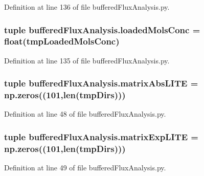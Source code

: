 Definition at line 136 of file buffered\-Flux\-Analysis.\-py.

\hypertarget{namespacebuffered_flux_analysis_a7e05b85cf7e9b63ac9aa0582932185b4}{
\subsubsection[{loaded\-Mols\-Conc}]{\setlength{\rightskip}{0pt plus 5cm}tuple buffered\-Flux\-Analysis.\-loaded\-Mols\-Conc = float(tmp\-Loaded\-Mols\-Conc)}}\label{namespacebuffered_flux_analysis_a7e05b85cf7e9b63ac9aa0582932185b4}


Definition at line 135 of file buffered\-Flux\-Analysis.\-py.

\hypertarget{namespacebuffered_flux_analysis_a1f521f6f720583fe2e06f9a3127841fb}{
\subsubsection[{matrix\-Abs\-L\-I\-T\-E}]{\setlength{\rightskip}{0pt plus 5cm}tuple buffered\-Flux\-Analysis.\-matrix\-Abs\-L\-I\-T\-E = np.\-zeros((101,len({\bf tmp\-Dirs})))}}\label{namespacebuffered_flux_analysis_a1f521f6f720583fe2e06f9a3127841fb}


Definition at line 48 of file buffered\-Flux\-Analysis.\-py.

\hypertarget{namespacebuffered_flux_analysis_a75957649a19f5d8fc03e06de4e0e30b4}{
\subsubsection[{matrix\-Exp\-L\-I\-T\-E}]{\setlength{\rightskip}{0pt plus 5cm}tuple buffered\-Flux\-Analysis.\-matrix\-Exp\-L\-I\-T\-E = np.\-zeros((101,len({\bf tmp\-Dirs})))}}\label{namespacebuffered_flux_analysis_a75957649a19f5d8fc03e06de4e0e30b4}


Definition at line 49 of file buffered\-Flux\-Analysis.\-py.

